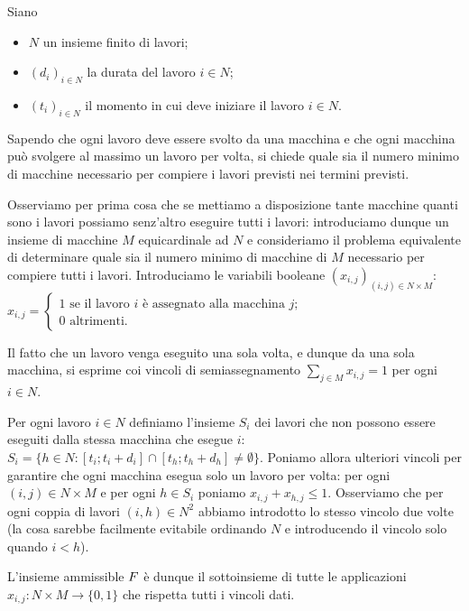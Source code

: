 \begin{Example}
	 Siano
	\begin{itemize}
		\item $N$ un insieme finito di lavori;
		\item $(d_i)_{i \in N}$ la durata del lavoro $i \in N$;
		\item $(t_i)_{i \in N}$ il momento in cui deve iniziare il lavoro $i \in N$.
	\end{itemize}
	Sapendo che ogni lavoro deve essere svolto da una macchina e che ogni macchina pu\`o svolgere al massimo un lavoro per volta, si chiede quale sia il numero minimo di macchine necessario per compiere i lavori previsti nei termini previsti.
	\par Osserviamo per prima cosa che se mettiamo a disposizione tante macchine quanti sono i lavori possiamo senz'altro eseguire tutti i lavori: introduciamo dunque un insieme di macchine $M$ equicardinale ad $N$ e consideriamo il problema equivalente di determinare quale sia il numero minimo di macchine di $M$ necessario per compiere tutti i lavori. Introduciamo le variabili booleane $(x_{i,j})_{(i,j) \in N \times M}$: $x_{i,j} = \begin{cases} 1\text{ se il lavoro }i\text{ \`e assegnato alla macchina }j;\\0\text{ altrimenti.}\end{cases}$
	\par Il fatto che un lavoro venga eseguito una sola volta, e dunque da una sola macchina, si esprime coi vincoli di semiassegnamento $\sum_{j \in M}x_{i,j} = 1$ per ogni $i \in N$.
	\par Per ogni lavoro $i \in N$ definiamo l'insieme $S_i$ dei lavori che non possono essere eseguiti dalla stessa macchina che esegue $i$: $S_i = \lbrace h \in N: [t_i;t_i + d_i] \cap [t_h;t_h + d_h] \neq \emptyset \rbrace$. Poniamo allora ulteriori vincoli per garantire che ogni macchina esegua solo un lavoro per volta: per ogni $(i,j) \in N \times M$ e per ogni $h \in S_i$ poniamo $x_{i,j} + x_{h,j} \leq 1$. Osserviamo che per ogni coppia di lavori $(i,h) \in N^2$ abbiamo introdotto lo stesso vincolo due volte (la cosa sarebbe facilmente evitabile ordinando $N$ e introducendo il vincolo solo quando $i < h$).
	\par L'insieme ammissible $F$ \`e dunque il sottoinsieme di tutte le applicazioni $x_{i,j}: N \times M \rightarrow \lbrace 0, 1\rbrace$ che rispetta tutti i vincoli dati.

\end{Example}
